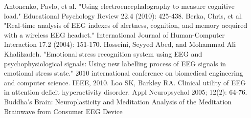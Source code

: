 \documentclass{llncs} %
\begin{document}
\begin{thebibliography}{[MT1]}
    Antonenko, Pavlo, et al. "Using electroencephalography to measure cognitive load." Educational Psychology Review 22.4 (2010): 425-438.
    Berka, Chris, et al. "Real-time analysis of EEG indexes of alertness, cognition, and memory acquired with a wireless EEG headset." International Journal of Human-Computer Interaction 17.2 (2004): 151-170.
    Hosseini, Seyyed Abed, and Mohammad Ali Khalilzadeh. "Emotional stress recognition system using EEG and psychophysiological signals: Using new labelling process of EEG signals in emotional stress state." 2010 international conference on biomedical engineering and computer science. IEEE, 2010.
    Loo SK, Barkley RA. Clinical utility of EEG in attention deficit hyperactivity disorder. Appl Neuropsychol 2005; 12(2): 64-76.
    Buddha’s Brain: Neuroplasticity and Meditation
    Analysis of the Meditation Brainwave from    Consumer EEG Device
\end{thebibliography}
\end{document}
